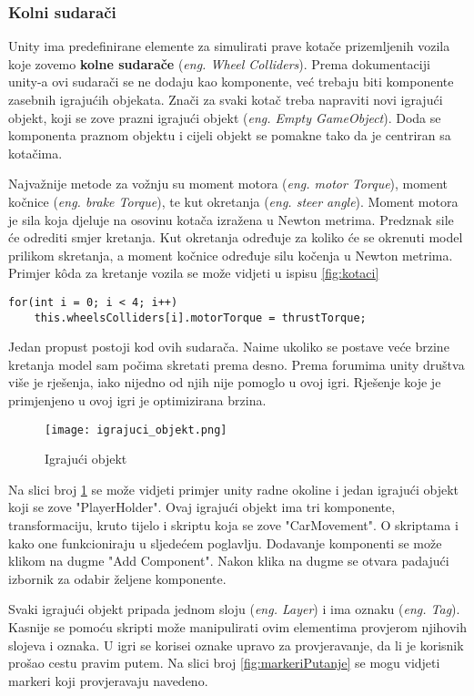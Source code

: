 \subsubsection{Kolni sudarači}
Unity ima predefinirane elemente za simulirati prave kotače prizemljenih vozila koje zovemo \textbf{kolne sudarače} (\emph{eng. Wheel Colliders}). Prema dokumentaciji unity-a ovi sudarači se ne dodaju kao komponente, već trebaju biti komponente zasebnih igrajućih objekata. Znači za svaki kotač treba napraviti novi igrajući objekt, koji se zove prazni igrajući objekt (\emph{eng. Empty GameObject}). Doda se komponenta praznom objektu i cijeli objekt se pomakne tako da je centriran sa kotačima. \par
Najvažnije metode za vožnju su moment motora (\emph{eng. motor Torque}), moment kočnice (\emph{eng. brake Torque}), te kut okretanja (\emph{eng. steer angle}). Moment motora je sila koja djeluje na osovinu kotača izražena u Newton metrima. Predznak sile će odrediti smjer kretanja. Kut okretanja određuje za koliko će se okrenuti model prilikom skretanja, a moment kočnice određuje silu kočenja u Newton metrima. Primjer k\^oda za kretanje vozila se može vidjeti u ispisu \ref{fig:kotaci}

\begin{lstlisting}[caption={Skripta za kretanje vozila}, label=kretanjeVozila]
for(int i = 0; i < 4; i++)
    this.wheelsColliders[i].motorTorque = thrustTorque;
\end{lstlisting}

Jedan propust postoji kod ovih sudarača. Naime ukoliko se postave veće brzine kretanja model sam počima skretati prema desno. Prema forumima unity društva više je rješenja, iako nijedno od njih nije pomoglo u ovoj igri. Rješenje koje je primjenjeno u ovoj igri je optimizirana brzina.

\begin{figure}[h]
	\texttt{[image: igrajuci\_objekt.png]}
	\centering
	\caption{Igrajući objekt}
	\label{fig:igrajuciobjekt}
\end{figure}
\newpage
Na slici broj \ref{fig:igrajuciobjekt} se može vidjeti primjer unity radne okoline i jedan igrajući objekt koji se zove "PlayerHolder". Ovaj igrajući objekt ima tri komponente, transformaciju, kruto tijelo i skriptu koja se zove "CarMovement". O skriptama i kako one funkcioniraju u sljedećem poglavlju. Dodavanje komponenti se može klikom na dugme "Add Component". Nakon klika na dugme se otvara padajući izbornik za odabir željene komponente. \par
Svaki igrajući objekt pripada jednom sloju (\emph{eng. Layer}) i ima oznaku (\emph{eng. Tag}). Kasnije se pomoću skripti može manipulirati ovim elementima provjerom njihovih slojeva i oznaka. U igri se korisei oznake upravo za provjeravanje, da li je korisnik prošao cestu pravim putem. Na slici broj \ref{fig:markeriPutanje} se mogu vidjeti markeri koji provjeravaju navedeno.

